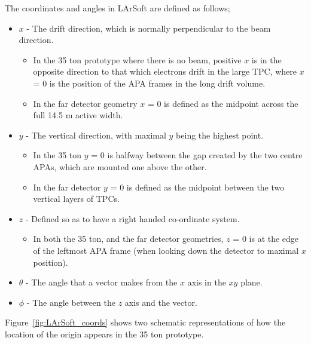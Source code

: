 The coordinates and angles in LArSoft are defined as follows;
\begin{itemize}
\item $x$ - The drift direction, which is normally perpendicular to the beam direction.
  \begin{itemize}
  \item In the 35 ton prototype where there is no beam, positive $x$ is in the opposite direction to that which electrons drift in the large TPC, where $x$ = 0 is the position of the APA frames in the long drift volume.
  \item In the far detector geometry $x$ = 0 is defined as the midpoint across the full 14.5 m active width.
  \end{itemize}
\item $y$ - The vertical direction, with maximal $y$ being the highest point.
  \begin{itemize}
  \item In the 35 ton $y$ = 0 is halfway between the gap created by the two centre APAs, which are mounted one above the other.
  \item In the far detector $y$ = 0 is defined as the midpoint between the two vertical layers of TPCs.
  \end {itemize}
\item $z$ - Defined so as to have a right handed co-ordinate system.
  \begin{itemize}
  \item In both the 35 ton, and the far detector geometries, $z$ = 0 is at the edge of the leftmost APA frame (when looking down the detector to maximal $x$ position).
  \end{itemize}
\item $\theta$ - The angle that a vector makes from the $x$ axis in the $xy$ plane.
\item $\phi$ - The angle between the $z$ axis and the vector.
\end{itemize}
Figure~\ref{fig:LArSoft_coords} shows two schematic representations of how the location of the origin appears in the 35 ton prototype.\\

